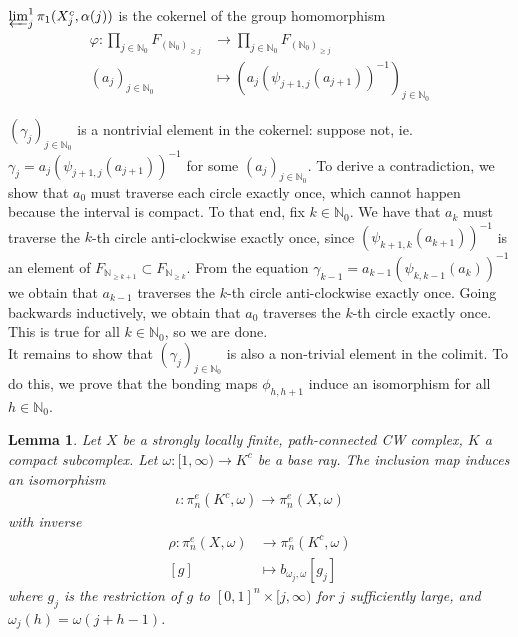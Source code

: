 \documentclass[a4paper,11pt]{article}
\theoremstyle{definition}
\theoremstyle{plain}
\newtheorem{lemma}[definition]{Lemma}
\theoremstyle{remark}
\begin{document}
{$\varprojlim^1_{j} \pi_{1}(X^{c}_{j},\alpha(j))$ is the cokernel of the group homomorphism 
\begin{align*}
\varphi: \prod_{j\in \mathbb{N}_{0}} F_{(\mathbb{N}_{0})_{\geq j}} &\rightarrow \prod_{j\in \mathbb{N}_{0}} F_{(\mathbb{N}_{0})_{\geq j}} \\
(a_{j})_{j\in \mathbb{N}_{0}} &\mapsto (a_{j}(\psi_{j+1,j}(a_{j+1}))^{-1})_{j\in \mathbb{N}_{0}}
\end{align*}

$(\gamma_{j})_{j \in \mathbb{N}_{0}}$ is a nontrivial element in the cokernel: suppose not, ie. $\gamma_{j} =  a_{j}(\psi_{j+1,j}(a_{j+1}))^{-1}$ for some $(a_{j})_{j\in \mathbb{N}_{0}}$. To derive a contradiction, we show that $a_{0}$ must traverse each circle exactly once, which cannot happen because the interval is compact. To that end, fix $k\in \mathbb{N}_{0}$. We have that $a_{k}$ must traverse the $k$-th circle anti-clockwise exactly once, since $(\psi_{k+1,k}(a_{k+1}))^{-1}$ is an element of $F_{\mathbb{N}_{\geq k+1}}\subset F_{\mathbb{N}_{\geq k}}$. From the equation $\gamma_{k-1} = a_{k-1} (\psi_{k,k-1}(a_{k}))^{-1}$ we obtain that $a_{k-1}$ traverses the $k$-th circle anti-clockwise exactly once. Going backwards inductively, we obtain that $a_{0}$ traverses the $k$-th circle exactly once. This is true for all $k\in \mathbb{N}_{0}$, so we are done. \\

It remains to show that $(\gamma_{j})_{j \in \mathbb{N}_{0}}$ is also a non-trivial element in the colimit. To do this, we prove that the bonding maps $\phi_{h,h+1}$ induce an isomorphism for all $h\in \mathbb{N}_{0}$.\\

\begin{lemma} Let $X$ be a strongly locally finite, path-connected CW complex, $K$ a compact subcomplex. Let $\omega: [1,\infty)\rightarrow K^c$ be a base ray. The inclusion map induces an isomorphism 
\begin{align*}
\iota: \pi_{n}^{e}(K^c,\omega) \rightarrow  \pi_{n}^{e}(X,\omega)
\end{align*}
with inverse
\begin{align*}
\rho: \pi_{n}^{e}(X,\omega) &\rightarrow   \pi_{n}^{e}(K^c,\omega)\\
[g] &\mapsto b_{\omega_{j},\omega}[g_{j}] 
\end{align*}
where $g_{j}$ is the restriction of $g$ to $[0,1]^n \times [j,\infty)$ for $j$ sufficiently large, and $\omega_{j}(h)= \omega(j+h-1)$. 
\end{lemma}

}
\end{document}
